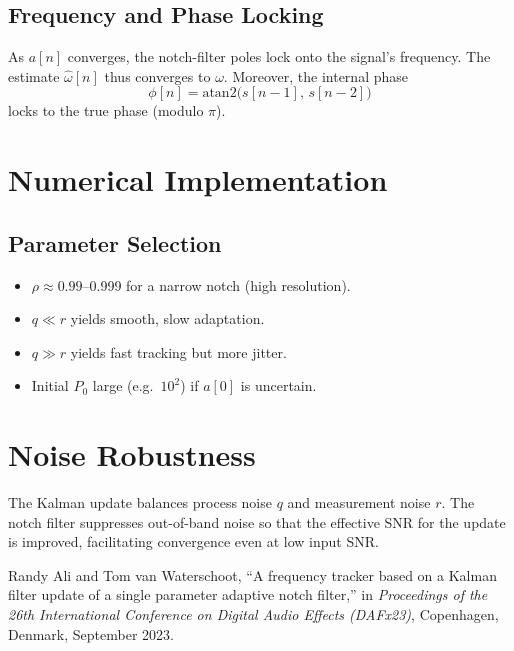 \documentclass{article}
\begin{document}
\subsection{Frequency and Phase Locking}
As \(a[n]\) converges, the notch-filter poles lock onto the signal’s frequency.  The estimate \(\hat\omega[n]\) thus converges to \(\omega\).  Moreover, the internal phase
\[
\phi[n] = \mathrm{atan2}\bigl(s[n-1],\,s[n-2]\bigr)
\]
locks to the true phase (modulo \(\pi\)).

\section{Numerical Implementation}

\subsection{Parameter Selection}
\begin{itemize}
  \item \(\rho\approx0.99\)–0.999 for a narrow notch (high resolution).  
  \item \(q\ll r\) yields smooth, slow adaptation.  
  \item \(q\gg r\) yields fast tracking but more jitter.  
  \item Initial \(P_0\) large (e.g.\ \(10^2\)) if \(a[0]\) is uncertain.  
\end{itemize}


\section{Noise Robustness}

The Kalman update balances process noise \(q\) and measurement noise \(r\).  The notch filter suppresses out-of-band noise so that the effective SNR for the update is improved, facilitating convergence even at low input SNR.

\begin{thebibliography}{9}
Randy Ali and Tom van Waterschoot,  
``A frequency tracker based on a Kalman filter update of a single parameter adaptive notch filter,''  
in \emph{Proceedings of the 26th International Conference on Digital Audio Effects (DAFx23)},  
Copenhagen, Denmark, September 2023.
\end{thebibliography}
\end{document}
